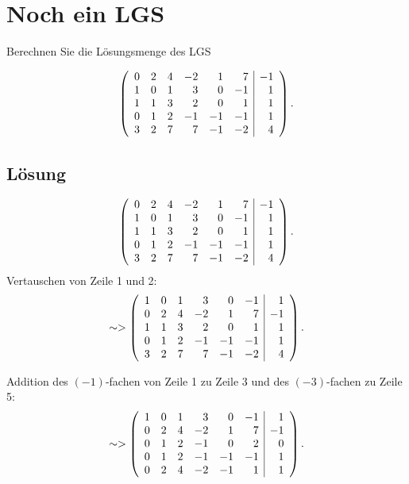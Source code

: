 \newpage
\section{Noch ein LGS}

Berechnen Sie die L\"osungsmenge des LGS

$$
	\left(
	\begin{array}{rrrrrr | r}
		0	& 2	& 4	& -2 	& 1	& 7	& -1\\
		1	& 0	& 1	& 3	& 0	& -1	& 1\\
		1	& 1	& 3	& 2	& 0	& 1	& 1\\
		0	& 1	& 2	& -1	& -1	& -1	& 1\\
		3	& 2	& 7	& 7	& -1	& -2	& 4
	\end{array}
	\right).
$$

\subsection*{L\"osung}

$$
	\left(
	\begin{array}{rrrrrr | r}
		0	& 2	& 4	& -2 	& 1	& 7	& -1\\
		1	& 0	& 1	& 3	& 0	& -1	& 1\\
		1	& 1	& 3	& 2	& 0	& 1	& 1\\
		0	& 1	& 2	& -1	& -1	& -1	& 1\\
		3	& 2	& 7	& 7	& -1	& -2	& 4
	\end{array}
	\right).
$$
Vertauschen von Zeile 1 und 2:
$$
	\sim>
	\left(
	\begin{array}{rrrrrr | r}
		1	& 0	& 1	& 3	& 0	& -1	& 1\\	
		0	& 2	& 4	& -2 	& 1	& 7	& -1\\
		1	& 1	& 3	& 2	& 0	& 1	& 1\\
		0	& 1	& 2	& -1	& -1	& -1	& 1\\
		3	& 2	& 7	& 7	& -1	& -2	& 4
	\end{array}
	\right).
$$

Addition des $(-1)$-fachen von Zeile 1 zu Zeile 3 und des $(-3)$-fachen zu Zeile 5:
$$
	\sim>
	\left(
	\begin{array}{rrrrrr | r}
		1	& 0	& 1	& 3	& 0	& -1	& 1\\	
		0	& 2	& 4	& -2 	& 1	& 7	& -1\\
		0	& 1	& 2	& -1	& 0	& 2	& 0\\
		0	& 1	& 2	& -1	& -1	& -1	& 1\\
		0	& 2	& 4	& -2	& -1	& 1	& 1
	\end{array}
	\right).
$$

